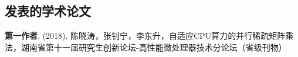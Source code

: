 \begin{resume}

  \section*{发表的学术论文} %

  \begin{enumerate}[label={[\arabic*]}]
  \addtolength{\itemsep}{-.36\baselineskip}%
  \item \textbf{第一作者}. (2018).  陈晓涛，张钊宁，李东升，自适应CPU算力的并行稀疏矩阵乘法，湖南省第十一届研究生创新论坛-高性能微处理器技术分论坛（省级刊物）
  \end{enumerate}
\end{resume}